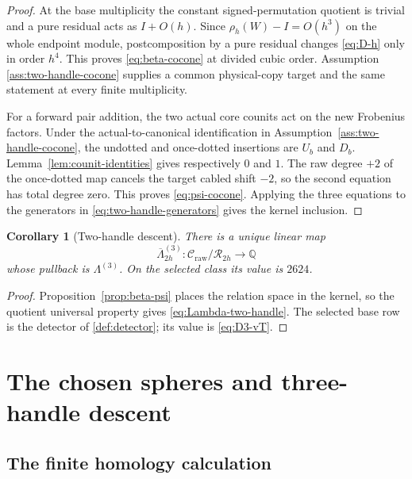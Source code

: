 \documentclass[10pt,reqno]{amsart}
\newtheorem{corollary}[theorem]{Corollary}
\theoremstyle{definition}
\theoremstyle{remark}
\newcommand{\Q}{\mathbb Q}
\begin{document}
\begin{proof}
At the base multiplicity the constant signed-permutation quotient is trivial
and a pure residual acts as $I+O(h)$.  Since
$\rho_h(W)-I=O(h^3)$ on the whole endpoint module, postcomposition by a pure
residual changes \cref{eq:D-h} only in order $h^4$.  This proves
\cref{eq:beta-cocone} at divided cubic order.  Assumption
\ref{ass:two-handle-cocone} supplies a common physical-copy target and the
same statement at every finite multiplicity.

For a forward pair addition, the two actual core counits act on the new
Frobenius factors.  Under the actual-to-canonical identification in
Assumption~\ref{ass:two-handle-cocone}, the undotted and once-dotted insertions
are $U_b$ and $D_b$.  Lemma~\ref{lem:counit-identities} gives respectively
$0$ and $1$.  The raw degree $+2$ of the once-dotted map cancels the target
cabled shift $-2$, so the second equation has total degree zero.  This proves
\cref{eq:psi-cocone}.  Applying the three equations to the generators in
\cref{eq:two-handle-generators} gives the kernel inclusion.
\end{proof}

\begin{corollary}[Two-handle descent]\label{cor:two-handle-descent}
There is a unique linear map
\begin{equation}\label{eq:Lambda-two-handle}
\overline\Lambda_{2h}^{(3)}:
\mathcal C_{\mathrm{raw}}/\mathcal R_{2h}\longrightarrow\Q
\end{equation}
whose pullback is $\Lambda^{(3)}$.  On the selected class its value is
$2624$.
\end{corollary}

\begin{proof}
Proposition~\ref{prop:beta-psi} places the relation space in the kernel, so
the quotient universal property gives \cref{eq:Lambda-two-handle}.  The
selected base row is the detector of \cref{def:detector}; its value is
\cref{eq:D3-vT}.
\end{proof}

\section{The chosen spheres and three-handle descent}\label{sec:three-handle-descent}

\subsection{The finite homology calculation}
\end{document}
